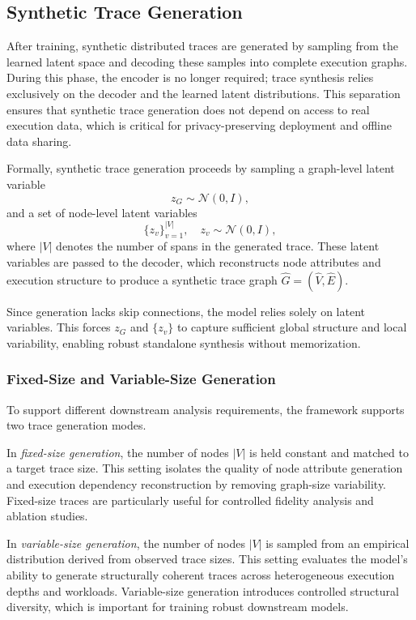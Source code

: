 \documentclass[sigconf,review]{acmart}
\begin{document}
\subsection{Synthetic Trace Generation}
\label{sec:generation}

After training, synthetic distributed traces are generated by sampling from the learned latent space and decoding these samples into complete execution graphs. During this phase, the encoder is no longer required; trace synthesis relies exclusively on the decoder and the learned latent distributions. This separation ensures that synthetic trace generation does not depend on access to real execution data, which is critical for privacy-preserving deployment and offline data sharing.

Formally, synthetic trace generation proceeds by sampling a graph-level latent variable
\[
z_G \sim \mathcal{N}(0, I),
\]
and a set of node-level latent variables
\[
\{z_v\}_{v=1}^{|V|}, \quad z_v \sim \mathcal{N}(0, I),
\]
where $|V|$ denotes the number of spans in the generated trace. These latent variables are passed to the decoder, which reconstructs node attributes and execution structure to produce a synthetic trace graph $\hat{G} = (\hat{V}, \hat{E})$.

Since generation lacks skip connections, the model relies solely on latent variables. This forces $z_G$ and $\{z_v\}$ to capture sufficient global structure and local variability, enabling robust standalone synthesis without memorization.

\subsubsection{Fixed-Size and Variable-Size Generation}

To support different downstream analysis requirements, the framework supports two trace generation modes.

In \emph{fixed-size generation}, the number of nodes $|V|$ is held constant and matched to a target trace size. This setting isolates the quality of node attribute generation and execution dependency reconstruction by removing graph-size variability. Fixed-size traces are particularly useful for controlled fidelity analysis and ablation studies.

In \emph{variable-size generation}, the number of nodes $|V|$ is sampled from an empirical distribution derived from observed trace sizes. This setting evaluates the model’s ability to generate structurally coherent traces across heterogeneous execution depths and workloads. Variable-size generation introduces controlled structural diversity, which is important for training robust downstream models.
\end{document}
